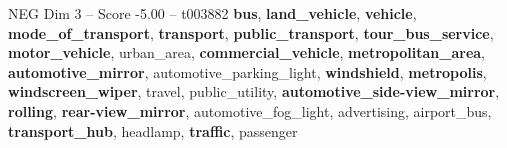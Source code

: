 \begin{textsample}{NEG Dim 3 – Score -5.00 – t003882}  \label{ex:f3_neg_027}
\textbf{bus}, \textbf{land\_vehicle}, \textbf{vehicle}, \textbf{mode\_of\_transport}, \textbf{transport}, \textbf{public\_transport}, \textbf{tour\_bus\_service}, \textbf{motor\_vehicle}, urban\_area, \textbf{commercial\_vehicle}, \textbf{metropolitan\_area}, \textbf{automotive\_mirror}, automotive\_parking\_light, \textbf{windshield}, \textbf{metropolis}, \textbf{windscreen\_wiper}, travel, public\_utility, \textbf{automotive\_side-view\_mirror}, \textbf{rolling}, \textbf{rear-view\_mirror}, automotive\_fog\_light, advertising, airport\_bus, \textbf{transport\_hub}, headlamp, \textbf{traffic}, passenger

\end{textsample}
